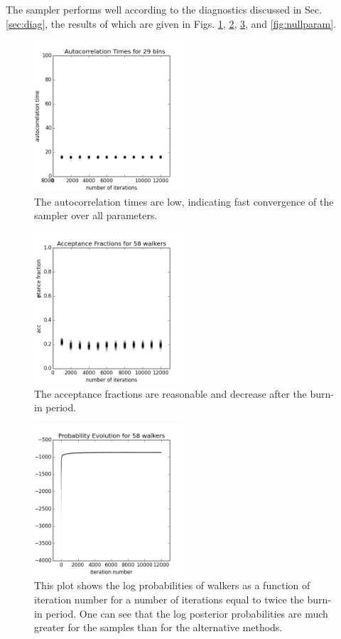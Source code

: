 \documentclass[preprint]{aastex}
\begin{document}
The sampler performs well according to the diagnostics discussed in Sec. 
\ref{sec:diag}, the results of which are given in Figs. \ref{fig:nullacor}, 
\ref{fig:nullfrac}, \ref{fig:nullprob}, and \ref{fig:nullparam}.  

\begin{figure}
\includegraphics[width=0.5\textwidth]{times-real.png}
\caption{The autocorrelation times are low, indicating fast convergence of the 
sampler over all parameters.}
\label{fig:nullacor}
\end{figure}

\begin{figure}
\includegraphics[width=0.5\textwidth]{fracs-real.png}
\caption{The acceptance fractions are reasonable and decrease after the burn-in 
period.}
\label{fig:nullfrac}
\end{figure}

\begin{figure}
\includegraphics[width=0.5\textwidth]{probs-real.png}
\caption{This plot shows the log probabilities of walkers as a function of 
iteration number for a number of iterations equal to twice the burn-in period.  
One can see that the log posterior probabilities are much greater for the 
samples than for the alternative methods.}
\label{fig:nullprob}
\end{figure}
\end{document}

